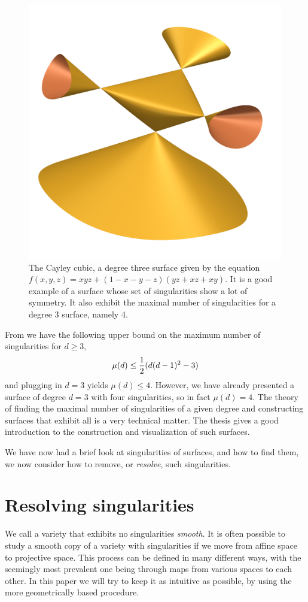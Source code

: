 \documentclass{article}
\begin{document}
\begin{example}
        \begin{figure}[h!]
            \centering
            \includegraphics[width=0.3\linewidth]{pictures/cayley_cubic.png}
            \caption{The Cayley cubic, a degree three surface given by the
                equation $f(x, y, z) = xyz + (1 - x  - y - z)(yz + xz + xy)$.
                It is a good example of a surface whose set of singularities
                show a lot of symmetry. It also exhibit the maximal number of
                singularities for a degree $3$ surface, namely 4.}
            \label{fig:cayley}
        \end{figure}
    \end{example}     
    
    From \cite[p.~7]{Lab14} we have the following upper bound on the maximum
    number of singularities for $d \geq 3$,
    \begin{equation}
        \notag
        \mu(d) \leq \frac{1}{2}(d(d-1)^2 - 3)
    \end{equation}
    and plugging in $d = 3$ yields $\mu(d) \leq 4$. However, we have already
    presented a surface of degree $d = 3$ with four singularities, so in fact
    $\mu(d) = 4$. The theory of finding the maximal number of singularities of
    a given degree and constructing surfaces that exhibit all is a very
    technical matter. The thesis \cite{oliver2005hypersurfaces} gives a good
    introduction to the construction and visualization of such surfaces.

    We have now had a brief look at singularities of surfaces, and how to find
    them, we now consider how to remove, or \emph{resolve}, such singularities.
    
    \section{Resolving singularities}
    \label{sec:resolving_singularities}
    
    We call a variety that exhibits no singularities \emph{smooth}. It is often possible to study a smooth copy of a variety with
    singularities if we move from affine space to projective space. This
    process can be defined in many different ways, with the seemingly most
    prevalent one being through maps from various spaces to each other. In this
    paper we will try to keep it as intuitive as possible, by using the more
    geometrically based procedure.
\end{document}
